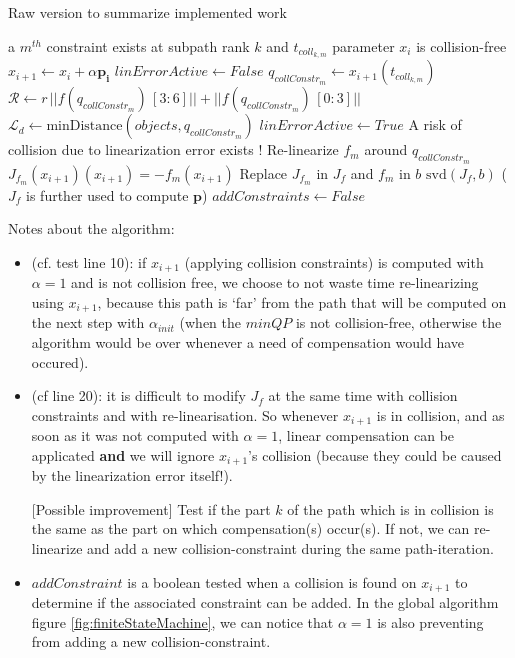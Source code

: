 \documentclass {article}
\newcommand\p{\mathbf{p_i}}
\begin{document}
\begin{algorithm}
\caption{Raw version to summarize implemented work}
\label{algo:affineCompensation}
\begin{algorithmic}[1] %
   \State a $m^{th}$ constraint exists at subpath rank $k$ and $t{_{coll_{k,m}}}$ parameter
   \State $x_i$ is collision-free
   \State $x_{i+1} \gets x_i + \alpha \p$
   \State $linErrorActive \gets False$
   		\State $q_{collConstr_m} \gets x_{i+1}(t{_{coll_{k,m}}})$
   		\State $\mathscr{R} \gets r \, ||f(q_{collConstr_m})\,[3:6]|| + ||f(q_{collConstr_m})\,[0:3]||$
   		\State $\mathscr{L}_d \gets \text{minDistance}(objects, q_{collConstr_m})$
   			\State $linErrorActive \gets True$
   			\State A risk of collision due to linearization error exists !
   			\State Re-linearize $f_m$ around $q_{collConstr_m}$
   			\State $J_{f_m}(x_{i+1})(x_{i+1}) = -f_m(x_{i+1})$
   			\State Replace $J_{f_m}$ in $J_f$ and $f_m$ in $b$
   		\EndIf
   \EndFor
   		\State $\text{svd}(J_f,b)$ 
   		\State ($J_f$ is further used to compute $\mathbf{p}$)
   		\State $addConstraints \gets False$
   \EndIf
\EndProcedure
\end{algorithmic}
\end{algorithm}

Notes about the algorithm:
\begin{itemize}
\item (cf. test line 10): if $x_{i+1}$ (applying collision constraints) is computed 
with $\alpha=1$ and is not collision free, we choose to not waste time re-linearizing
 using $x_{i+1}$, because this path is `far' from the path that will be computed on the next step with $\alpha_{init}$ (when the $minQP$ is not collision-free, otherwise 
 the algorithm would be over whenever a need of compensation would have occured).
 
\item (cf line 20): it is difficult to modify $J_f$ at the same time with 
collision constraints and with re-linearisation. So whenever $x_{i+1}$ is in 
collision, and as soon as it was not computed with $\alpha=1$, linear compensation can 
be applicated \textbf{and} we will ignore $x_{i+1}$'s collision (because they could be caused by the linearization error itself!).

[Possible improvement] Test if the part $k$ of the path which is in collision is the same as the part on which compensation(s) occur(s). If not, we can re-linearize and add a new collision-constraint during the same path-iteration.

\item $addConstraint$ is a boolean tested when a collision is found on $x_{i+1}$ 
to determine if the associated constraint can be added. In the global algorithm 
figure \ref{fig:finiteStateMachine}, we can notice that $\alpha=1$ is also preventing from adding a new collision-constraint.
\end{itemize}
\end{document}
